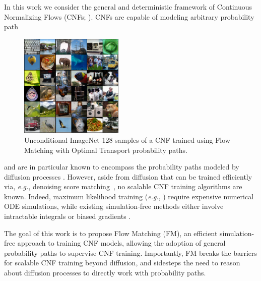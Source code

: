 \documentclass{article}
\makeatletter
\renewcommand*{\eg}{{\it e.g.}\@\xspace}
\makeatother
\begin{document}
%
In this work we consider the general and deterministic framework of Continuous Normalizing Flows (CNFs; \citet{chen2018neural}). 
%
CNFs are capable of modeling arbitrary probability path 
\begin{figure}
\vspace{-17pt}
  \begin{center}
  \includegraphics[width=0.44\textwidth]{figures/imagenet128/imagenet128_curated_.png}
  \end{center}
  \vspace{-1em}
  \caption{Unconditional ImageNet-128 samples of a CNF trained using Flow Matching with Optimal Transport probability paths.}
\label{fig:teaser_256}
\end{figure} 
and are in particular known to
encompass the probability paths modeled by diffusion processes \citep{song2021maximum}. However, aside from diffusion that can be trained  efficiently via, \eg, denoising score matching~\citep{vincent2011connection}, no scalable CNF training algorithms are known. Indeed, maximum likelihood training (\eg, \citet{ffjord2018}) require expensive numerical ODE simulations, while existing simulation-free methods either involve intractable integrals \citep{rozen2021moser} or biased gradients \citep{ben2022matching}. 

The goal of this work is to propose Flow Matching (FM), an efficient simulation-free approach to training CNF models, allowing the adoption of general probability paths to supervise CNF training.  Importantly, FM breaks the barriers for scalable CNF training beyond diffusion, and sidesteps the need to reason about diffusion processes to directly work with probability paths.
\end{document}
